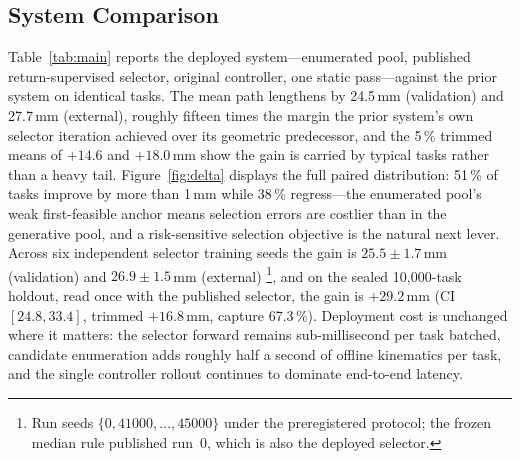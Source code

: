 \documentclass{svproc}
\newcommand{\sealedDelta}{$+29.2$}
\newcommand{\sealedCI}{$[24.8,33.4]$}
\newcommand{\sealedTrim}{$+16.8$}
\newcommand{\sealedCapture}{67.3}
\begin{document}
\subsection{System Comparison}
\label{sec:main}
Table~\ref{tab:main} reports the deployed system---enumerated pool, published
return-supervised selector, original controller, one static pass---against
the prior system on identical tasks. The mean path lengthens by 24.5\,mm
(validation) and 27.7\,mm (external), roughly fifteen times the margin the
prior system's own selector iteration achieved over its geometric
predecessor, and the 5\,\% trimmed means of $+14.6$ and $+18.0$\,mm show the
gain is carried by typical tasks rather than a heavy tail.
Figure~\ref{fig:delta} displays the full paired distribution: 51\,\% of tasks
improve by more than 1\,mm while 38\,\% regress---the enumerated pool's weak
first-feasible anchor means selection errors are costlier than in the
generative pool, and a risk-sensitive selection objective is the natural next
lever. Across six independent selector training seeds the gain is
$25.5\pm1.7$\,mm (validation) and $26.9\pm1.5$\,mm (external)%
\footnote{Run seeds $\{0,41000,\dots,45000\}$ under the preregistered
protocol; the frozen median rule published run~0, which is also the deployed
selector.}, and on the
sealed 10{,}000-task holdout, read once with the published selector, the gain
is \sealedDelta\,mm (CI \sealedCI, trimmed \sealedTrim\,mm, capture
\sealedCapture\,\%). Deployment cost is unchanged where it matters: the
selector forward remains sub-millisecond per task batched, candidate
enumeration adds roughly half a second of offline kinematics per task, and
the single controller rollout continues to dominate end-to-end latency.
\end{document}
